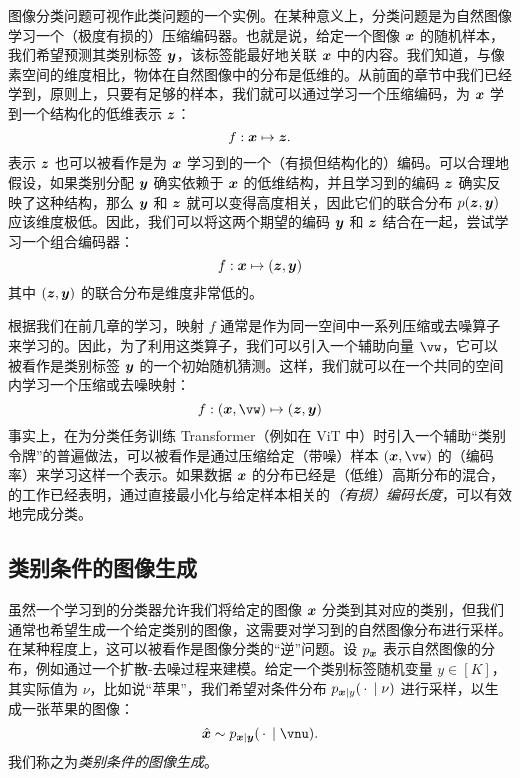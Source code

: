 \documentclass[../../book-main_zh.tex]{subfiles}
\begin{document}
图像分类问题可视作此类问题的一个实例。在某种意义上，分类问题是为自然图像学习一个（极度有损的）压缩编码器。也就是说，给定一个图像 $\bm{x}$ 的随机样本，我们希望预测其类别标签 $\bm{y}$，该标签能最好地关联 $\bm{x}$ 中的内容。我们知道，与像素空间的维度相比，物体在自然图像中的分布是低维的。从前面的章节中我们已经学到，原则上，只要有足够的样本，我们就可以通过学习一个压缩编码，为 $\bm{x}$ 学到一个结构化的低维表示 $\bm{z}$：
\begin{equation}
    f: \bm{x} \mapsto \bm{z}. 
\end{equation}
表示 $\bm{z}$ 也可以被看作是为 $\bm{x}$ 学习到的一个（有损但结构化的）编码。可以合理地假设，如果类别分配 $\bm{y}$ 确实依赖于 $\bm{x}$ 的低维结构，并且学习到的编码 $\bm{z}$ 确实反映了这种结构，那么 $\bm{y}$ 和 $\bm{z}$ 就可以变得高度相关，因此它们的联合分布 $p(\bm{z}, \bm{y})$ 应该维度极低。因此，我们可以将这两个期望的编码 $\bm{y}$ 和 $\bm{z}$ 结合在一起，尝试学习一个组合编码器：
\begin{equation}
    f: \bm{x} \mapsto (\bm{z}, \bm{y}) 
\end{equation}
其中 $(\bm{z}, \bm{y})$ 的联合分布是维度非常低的。

根据我们在前几章的学习，映射 $f$ 通常是作为同一空间中一系列压缩或去噪算子来学习的。因此，为了利用这类算子，我们可以引入一个辅助向量 $\vw$，它可以被看作是类别标签 $\bm{y}$ 的一个初始随机猜测。这样，我们就可以在一个共同的空间内学习一个压缩或去噪映射：
\begin{equation}\label{eq:classifier-with-class-token}
    f: (\x, \vw) \mapsto (\z, \y)
\end{equation}
事实上，在为分类任务训练 Transformer（例如在 ViT 中）时引入一个辅助“类别令牌”的普遍做法，可以被看作是通过压缩给定（带噪）样本 $(\x, \vw)$ 的（编码率）来学习这样一个表示。如果数据 $\bm{x}$ 的分布已经是（低维）高斯分布的混合，\cite{wright2008classification} 的工作已经表明，通过直接最小化与给定样本相关的{\em（有损）编码长度}，可以有效地完成分类。


\subsection{类别条件的图像生成}\label{sub:cfg} 
虽然一个学习到的分类器允许我们将给定的图像 $\bm{x}$ 分类到其对应的类别，但我们通常也希望生成一个给定类别的图像，这需要对学习到的自然图像分布进行采样。在某种程度上，这可以被看作是图像分类的“逆”问题。设 $p_{\bm{x}}$ 表示自然图像的分布，例如通过一个扩散-去噪过程来建模。给定一个类别标签随机变量 $y \in [K]$，其实际值为 $\nu$，比如说“苹果”，我们希望对条件分布 $p_{\bm{x} \mid y}(\,\cdot\, \mid \nu)$ 进行采样，以生成一张苹果的图像：
\begin{equation}
  \hat{\x} \sim p_{\x\mid \y}(\,\cdot\, \mid \vnu).
\end{equation}
我们称之为{\em 类别条件的图像生成}。
\end{document}
